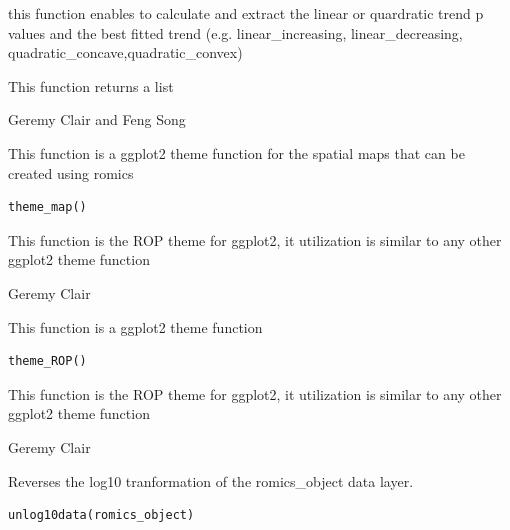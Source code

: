 \documentclass[a4paper]{book}
\begin{document}
%
\begin{Details}
this function enables to calculate and extract the linear or quardratic trend p values and the best fitted trend (e.g. linear\_increasing, linear\_decreasing, quadratic\_concave,quadratic\_convex)
\end{Details}
%
\begin{Value}
This function returns a list
\end{Value}
%
\begin{Author}
Geremy Clair and Feng Song
\end{Author}
%
\begin{Description}
This function is a ggplot2 theme function for the spatial maps that can be created using romics
\end{Description}
%
\begin{Usage}
\begin{verbatim}
theme_map()
\end{verbatim}
\end{Usage}
%
\begin{Details}
This function is the ROP theme for ggplot2, it utilization is similar to any other ggplot2 theme function
\end{Details}
%
\begin{Author}
Geremy Clair
\end{Author}
%
\begin{Description}
This function is a ggplot2 theme function
\end{Description}
%
\begin{Usage}
\begin{verbatim}
theme_ROP()
\end{verbatim}
\end{Usage}
%
\begin{Details}
This function is the ROP theme for ggplot2, it utilization is similar to any other ggplot2 theme function
\end{Details}
%
\begin{Author}
Geremy Clair
\end{Author}
%
\begin{Description}
Reverses the log10 tranformation of the romics\_object data layer.
\end{Description}
%
\begin{Usage}
\begin{verbatim}
unlog10data(romics_object)
\end{verbatim}
\end{Usage}
\end{document}
